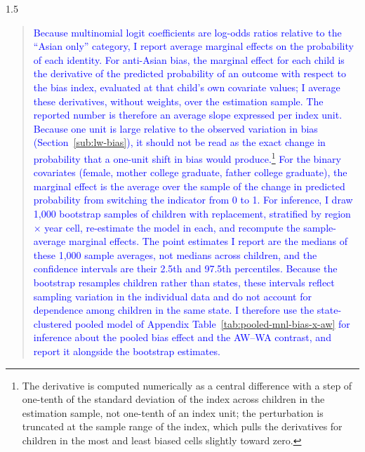 \documentclass[12pt,english]{article}
\newcommand{\rrxspc}{1.5}
\begin{document}
\begin{refsection}
\begin{spacing}{\rrxspc}
        \begin{quote}\textcolor{blue}{Because multinomial logit coefficients are log-odds ratios relative to the ``Asian only'' category, I report average marginal effects on the probability of each identity. For anti-Asian bias, the marginal effect for each child is the derivative of the predicted probability of an outcome with respect to the bias index, evaluated at that child's own covariate values; I average these derivatives, without weights, over the estimation sample. The reported number is therefore an average slope expressed per index unit. Because one unit is large relative to the observed variation in bias (Section~\ref{sub:lw-bias}), it should not be read as the exact change in probability that a one-unit shift in bias would produce.\footnote{The derivative is computed numerically as a central difference with a step of one-tenth of the standard deviation of the index across children in the estimation sample, not one-tenth of an index unit; the perturbation is truncated at the sample range of the index, which pulls the derivatives for children in the most and least biased cells slightly toward zero.} For the binary covariates (female, mother college graduate, father college graduate), the marginal effect is the average over the sample of the change in predicted probability from switching the indicator from 0 to 1. For inference, I draw 1{,}000 bootstrap samples of children with replacement, stratified by region $\times$ year cell, re-estimate the model in each, and recompute the sample-average marginal effects. The point estimates I report are the medians of these 1{,}000 sample averages, not medians across children, and the confidence intervals are their 2.5th and 97.5th percentiles. Because the bootstrap resamples children rather than states, these intervals reflect sampling variation in the individual data and do not account for dependence among children in the same state. I therefore use the state-clustered pooled model of Appendix Table~\ref{tab:pooled-mnl-bias-x-aw} for inference about the pooled bias effect and the AW--WA contrast, and report it alongside the bootstrap estimates.}\end{quote}

\end{spacing}
\end{refsection}
\end{document}
